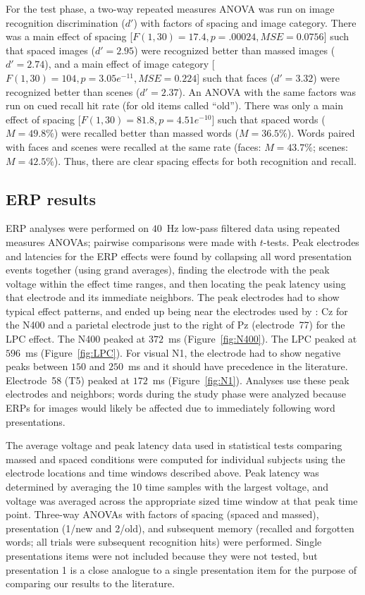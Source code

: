 For the test phase, a two-way repeated measures ANOVA was run on image recognition discrimination ($d'$) with factors of spacing and image category.  There was a main effect of spacing [$F(1,30)=17.4, p=.00024, MSE=0.0756$] such that spaced images ($d'=2.95$) were recognized better than massed images ($d'=2.74$), and a main effect of image category [$F(1,30)=104, p=3.05e^{-11}, MSE=0.224$] such that faces ($d'=3.32$) were recognized better than scenes ($d'=2.37$).  An ANOVA with the same factors was run on cued recall hit rate (for old items called ``old'').  There was only a main effect of spacing [$F(1,30)=81.8, p=4.51e^{-10}$] such that spaced words ($M=49.8\%$) were recalled better than massed words ($M=36.5\%$).  Words paired with faces and scenes were recalled at the same rate (faces: $M=43.7\%$; scenes: $M=42.5\%$).  Thus, there are clear spacing effects for both recognition and recall.

\subsection{ERP results}

ERP analyses were performed on $40$~Hz low-pass filtered data using repeated measures ANOVAs; pairwise comparisons were made with $t$-tests.  Peak electrodes and latencies for the ERP effects were found by collapsing all word presentation events together (using grand averages), finding the electrode with the peak voltage within the effect time ranges, and then locating the peak latency using that electrode and its immediate neighbors.  The peak electrodes had to show typical effect patterns, and ended up being near the electrodes used by : Cz for the N400 and a parietal electrode just to the right of Pz (electrode~77) for the LPC effect.  The N400 peaked at $372$~ms (Figure~\ref{fig:N400}).  The LPC peaked at $596$~ms (Figure~\ref{fig:LPC}).  For visual N1, the electrode had to show negative peaks between $150$ and $250$~ms and it should have precedence in the literature.  Electrode~58 (T5) peaked at $172$~ms (Figure~\ref{fig:N1}).  Analyses use these peak electrodes and neighbors; words during the study phase were analyzed because ERPs for images would likely be affected due to immediately following word presentations.

The average voltage and peak latency data used in statistical tests comparing massed and spaced conditions were computed for individual subjects using the electrode locations and time windows described above.  Peak latency was determined by averaging the 10 time samples with the largest voltage, and voltage was averaged across the appropriate sized time window at that peak time point.
Three-way ANOVAs with factors of spacing (spaced and massed), presentation (1/new and 2/old), and subsequent memory (recalled and forgotten words; all trials were subsequent recognition hits) were performed.  Single presentations items were not included because they were not tested, but presentation 1 is a close analogue to a single presentation item for the purpose of comparing our results to the literature.

